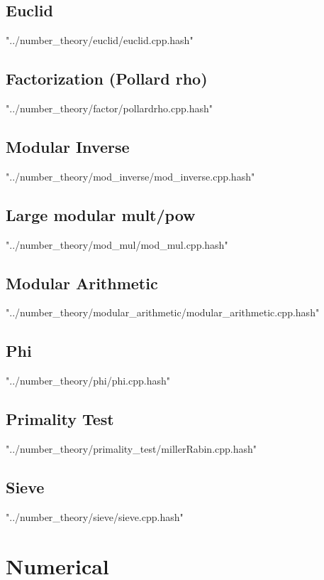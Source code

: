 \documentclass [5pt,twocolumn,oneside]{article}
\begin{document}
\begin{landscape}
\begin{multicols}{3}
\subsection{ Euclid}
 {"../number_theory/euclid/euclid.cpp.hash"}


\subsection{ Factorization (Pollard rho)}
 {"../number_theory/factor/pollardrho.cpp.hash"}


\subsection{ Modular Inverse}
 {"../number_theory/mod_inverse/mod_inverse.cpp.hash"}


\subsection{ Large modular mult/pow}
 {"../number_theory/mod_mul/mod_mul.cpp.hash"}


\subsection{ Modular Arithmetic}
 {"../number_theory/modular_arithmetic/modular_arithmetic.cpp.hash"}


\subsection{ Phi}
 {"../number_theory/phi/phi.cpp.hash"}


\subsection{ Primality Test}
 {"../number_theory/primality_test/millerRabin.cpp.hash"}


\subsection{ Sieve}
 {"../number_theory/sieve/sieve.cpp.hash"}



\section{Numerical}

\end{multicols}
\end{landscape}
\end{document}
